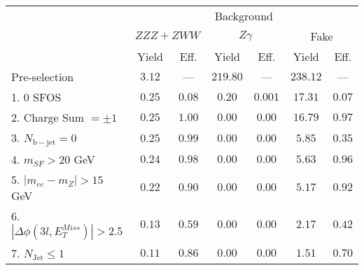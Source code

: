 \begin{tabular}{l||c|c||c|c||c|c}
\hline
 &  \multicolumn{6}{c}{Background} \\
 & \multicolumn{2}{c||}{$ZZZ+ZWW$} & \multicolumn{2}{c||}{$Z\gamma$} & \multicolumn{2}{c}{Fake}  \\ 
 & Yield & Eff. & Yield & Eff. & Yield & Eff. \\
\hline\hline
Pre-selection &  $3.12$ & --- &  $219.80$ &  --- &  $238.12$ &  --- \\ 
\hline
1. 0 SFOS &  $0.25$ &  $0.08$ &  $0.20$ &  $0.001$ &  $17.31$ &  $0.07$ \\ 
\hline
2. Charge Sum $= \pm 1$ &  $0.25$ &  $1.00$ &  $0.00$ &  $0.00$ &  $16.79$ &  $0.97$ \\ 
\hline
3. $N_{\mathrm{b-jet}} = 0$ &$0.25$ &  $0.99$ &  $0.00$ &  $0.00$ &  $5.85$ &  $0.35$ \\ 
\hline
4. $m_{SF} > 20$ GeV &$0.24$ &  $0.98$ &  $0.00$ &  $0.00$ &  $5.63$ &  $0.96$ \\ 
\hline
5. $|m_{ee} - m_{Z}| > 15$ GeV &$0.22$ &  $0.90$ &  $0.00$ &  $0.00$ &  $5.17$ &  $0.92$ \\ 
\hline
6. $|\Delta\phi(3l,E_{T}^{Miss})| > 2.5$ &$0.13$ &  $0.59$ &  $0.00$ &  $0.00$ &  $2.17$ &  $0.42$ \\ 
\hline
7. $N_{\mathrm{Jet}} \leq 1$ &$0.11$ &  $0.86$ &  $0.00$ &  $0.00$ &  $1.51$ &  $0.70$ \\ 
\hline
\end{tabular}



